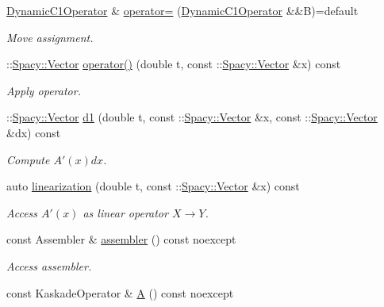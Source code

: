 \begin{DoxyCompactItemize}
\hyperlink{classSpacy_1_1Kaskade_1_1DynamicC1Operator}{Dynamic\+C1\+Operator} \& \hyperlink{classSpacy_1_1Kaskade_1_1DynamicC1Operator_ad7259427c3acfdccd8dc8e5c644ed8ea_ad7259427c3acfdccd8dc8e5c644ed8ea}{operator=} (\hyperlink{classSpacy_1_1Kaskade_1_1DynamicC1Operator}{Dynamic\+C1\+Operator} \&\&B)=default
\begin{DoxyCompactList}\small\item\em Move assignment. \end{DoxyCompactList}\item 
\+::\hyperlink{classSpacy_1_1Vector}{Spacy\+::\+Vector} \hyperlink{classSpacy_1_1Kaskade_1_1DynamicC1Operator_adc1e1c381ce922b284e89c669f0ac3de_adc1e1c381ce922b284e89c669f0ac3de}{operator()} (double t, const \+::\hyperlink{classSpacy_1_1Vector}{Spacy\+::\+Vector} \&x) const 
\begin{DoxyCompactList}\small\item\em Apply operator. \end{DoxyCompactList}\item 
\+::\hyperlink{classSpacy_1_1Vector}{Spacy\+::\+Vector} \hyperlink{classSpacy_1_1Kaskade_1_1DynamicC1Operator_a0845a4e92033d9eb31cc9d31e395355d_a0845a4e92033d9eb31cc9d31e395355d}{d1} (double t, const \+::\hyperlink{classSpacy_1_1Vector}{Spacy\+::\+Vector} \&x, const \+::\hyperlink{classSpacy_1_1Vector}{Spacy\+::\+Vector} \&dx) const 
\begin{DoxyCompactList}\small\item\em Compute $A'(x)dx$. \end{DoxyCompactList}\item 
auto \hyperlink{classSpacy_1_1Kaskade_1_1DynamicC1Operator_a18ee482621e290565ed494ddce1e7322_a18ee482621e290565ed494ddce1e7322}{linearization} (double t, const \+::\hyperlink{classSpacy_1_1Vector}{Spacy\+::\+Vector} \&x) const 
\begin{DoxyCompactList}\small\item\em Access $A'(x)$ as linear operator $X\rightarrow Y$. \end{DoxyCompactList}\item 
const Assembler \& \hyperlink{classSpacy_1_1Kaskade_1_1DynamicC1Operator_a9a110f3575ae78d0fc44f165d758583e_a9a110f3575ae78d0fc44f165d758583e}{assembler} () const noexcept
\begin{DoxyCompactList}\small\item\em Access assembler. \end{DoxyCompactList}\item 
\hypertarget{classSpacy_1_1Kaskade_1_1DynamicC1Operator_a763b8ec5c431dc4fe56f7ce010bcd0be}{}const Kaskade\+Operator \& \hyperlink{classSpacy_1_1Kaskade_1_1DynamicC1Operator_a763b8ec5c431dc4fe56f7ce010bcd0be}{A} () const noexcept\label{classSpacy_1_1Kaskade_1_1DynamicC1Operator_a763b8ec5c431dc4fe56f7ce010bcd0be}


\end{DoxyCompactItemize}
